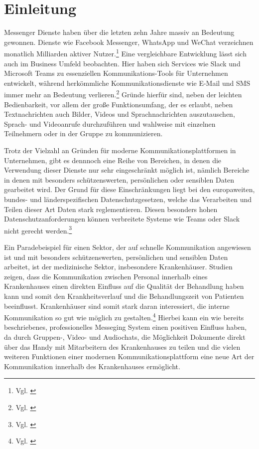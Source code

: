 \chapter{Einleitung}\label{chapter:einleitung}

Messenger Dienste haben über die letzten zehn Jahre massiv an Bedeutung gewonnen. Dienste wie Facebook Messenger, WhatsApp und WeChat verzeichnen monatlich Milliarden aktiver Nutzer.\footnote{Vgl. \cite{Ballve2014}} Eine vergleichbare Entwicklung lässt sich auch im Business Umfeld beobachten. Hier haben sich Services wie Slack und Microsoft Teams zu essenziellen Kommunikations-Tools für Unternehmen entwickelt, während herkömmliche Kommunikationsdienste wie E-Mail und SMS immer mehr an Bedeutung verlieren.\footnote{Vgl. \cite{Richter2019}}
Gründe hierfür sind, neben der leichten Bedienbarkeit, vor allem der große Funktionsumfang, der es erlaubt, neben Textnachrichten auch Bilder, Videos und Sprachnachrichten auszutauschen, Sprach- und Videoanrufe durchzuführen und wahlweise mit einzelnen Teilnehmern oder in der Gruppe zu kommunizieren.

Trotz der Vielzahl an Gründen für moderne Kommunikationsplattformen in Unternehmen, gibt es dennnoch eine Reihe von Bereichen, in denen die Verwendung dieser Dienste nur sehr eingeschränkt möglich ist, nämlich Bereiche in denen mit besonders schützenswerten, persönlichen oder sensiblen Daten gearbeitet wird. Der Grund für diese Einschränkungen liegt bei den europaweiten, bundes- und länderspezifischen Datenschutzgesetzen, welche das Verarbeiten und Teilen dieser Art Daten stark reglementieren. Diesen besonders hohen Datenschutzanforderungen können verbreitete Systeme wie Teams oder Slack nicht gerecht werden.\footnote{Vgl. \cite{Datenschutzkonferenz2019}}

Ein Paradebeispiel für einen Sektor, der auf schnelle Kommunikation angewiesen ist und mit besonders schützenswerten, persönlichen und sensiblen Daten arbeitet, ist der medizinische Sektor, insbesondere Krankenhäuser. Studien zeigen, dass die Kommunikation zwischen Personal innerhalb eines Krankenhauses einen direkten Einfluss auf die Qualität der Behandlung haben kann und somit den Krankheitsverlauf und die Behandlungszeit von Patienten beeinflusst. Krankenhäuser sind somit stark daran interessiert, die interne Kommunikation so gut wie möglich zu gestalten.\footnote{Vgl. \cite{G.Murphy2010}} Hierbei kann ein wie bereits beschriebenes, professionelles Messeging System einen positiven Einfluss haben, da durch Gruppen-, Video- und Audiochats, die Möglichkeit Dokumente direkt über das Handy mit Mitarbeitern des Krankenhauses zu teilen und die vielen weiteren Funktionen einer modernen Kommunikationsplattform eine neue Art der Kommunikation innerhalb des Krankenhauses ermöglicht.

